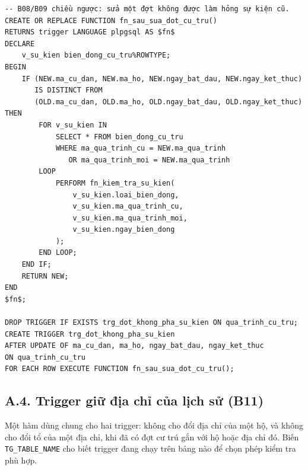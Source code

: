 \begin{lstlisting}[style=sqlvn, caption={Trigger khi sửa đợt cư trú: B08, B09 chiều ngược}, label={lst:pl_dot}]
-- B08/B09 chiều ngược: sửa một đợt không được làm hỏng sự kiện cũ.
CREATE OR REPLACE FUNCTION fn_sau_sua_dot_cu_tru()
RETURNS trigger LANGUAGE plpgsql AS $fn$
DECLARE
    v_su_kien bien_dong_cu_tru%ROWTYPE;
BEGIN
    IF (NEW.ma_cu_dan, NEW.ma_ho, NEW.ngay_bat_dau, NEW.ngay_ket_thuc)
       IS DISTINCT FROM
       (OLD.ma_cu_dan, OLD.ma_ho, OLD.ngay_bat_dau, OLD.ngay_ket_thuc) THEN
        FOR v_su_kien IN
            SELECT * FROM bien_dong_cu_tru
            WHERE ma_qua_trinh_cu = NEW.ma_qua_trinh
               OR ma_qua_trinh_moi = NEW.ma_qua_trinh
        LOOP
            PERFORM fn_kiem_tra_su_kien(
                v_su_kien.loai_bien_dong,
                v_su_kien.ma_qua_trinh_cu,
                v_su_kien.ma_qua_trinh_moi,
                v_su_kien.ngay_bien_dong
            );
        END LOOP;
    END IF;
    RETURN NEW;
END
$fn$;

DROP TRIGGER IF EXISTS trg_dot_khong_pha_su_kien ON qua_trinh_cu_tru;
CREATE TRIGGER trg_dot_khong_pha_su_kien
AFTER UPDATE OF ma_cu_dan, ma_ho, ngay_bat_dau, ngay_ket_thuc
ON qua_trinh_cu_tru
FOR EACH ROW EXECUTE FUNCTION fn_sau_sua_dot_cu_tru();
\end{lstlisting}

\subsection*{A.4. Trigger giữ địa chỉ của lịch sử (B11)}

Một hàm dùng chung cho hai trigger: không cho đổi địa chỉ của một hộ, và không cho đổi tổ của một địa chỉ, khi đã có đợt cư trú gắn với hộ hoặc địa chỉ đó. Biến \texttt{TG\_TABLE\_NAME} cho biết trigger đang chạy trên bảng nào để chọn phép kiểm tra phù hợp.

